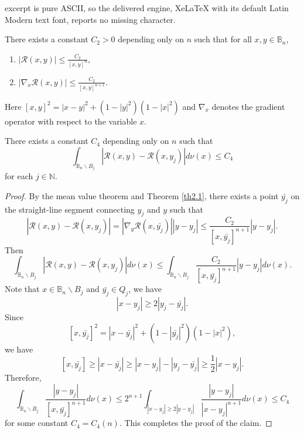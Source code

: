 \documentclass[10pt,a4paper]{amsart}
\newcommand{\B}{\mathbb{B}}
\newcommand{\N}{\mathbb{N}}
\begin{document}
excerpt is pure ASCII, so the delivered engine, XeLaTeX with its default Latin Modern text font, reports no missing character.
\begin{theorem}\label{th2.1}
	There exists a constant $C_2>0$ depending only on $n$ such that for all $x,y\in\B_n$,
	\begin{enumerate}[{(i)}]
		\item $|\mathcal{R} (x,y)|\leqslant\frac{C_2}{[x,y]^{n}},$
		\item $|\nabla_x\mathcal{R} (x,y)|\leqslant\frac{C_2}{[x,y]^{n+1}}.$
	\end{enumerate}
	Here $[x,y]^2=|x-y|^2+(1-|y|^2)(1-|x|^2)$ and $\nabla_x$ denotes the gradient operator with respect to the variable $x$.
\end{theorem}

\begin{claim}\label{claim2.1}
	There exists a constant $C_4$ depending only on $n$ such that
	\[\int_{\B_n\backslash B_j}|\mathcal{R} (x,y)-\mathcal{R} (x,y_j)|d\nu (x)\leqslant C_4\]
	for each $j\in\N$.
\end{claim}

\begin{proof}
By the mean value theorem and Theorem \ref{th2.1}, there exists a point $\bar{y_j}$ on the straight-line segment connecting $y_j$ and $y$ such that
\[|\mathcal{R} (x,y)-\mathcal{R} (x,y_j)|=|\nabla_y\mathcal{R} (x,\bar{y_j})| |y-y_j|\leqslant\frac{C_2}{[x,\bar{y_j}]^{n+1}}|y-y_j|.\]
Then 
\[
	\int_{\B_n\backslash B_j}|\mathcal{R} (x,y)-\mathcal{R} (x,y_j)|d\nu (x)\leqslant\int_{\B_n\backslash B_j}\frac{C_2}{[x,\bar{y_j}]^{n+1}}|y-y_j|d\nu(x).
\]
Note that $x\in\B_n\backslash B_j$ and $\bar{y_j}\in Q_j$, we have
\[|x-y_j|\geqslant 2|y_j-\bar{y_j}|.\]
Since 
\[
	[x,\bar{y_j}]^2=|x-\bar{y_j}|^2+(1-|\bar{y_j}|^2)(1-|x|^2),
\]
we have 
\[[x,\bar{y_j}]\geqslant |x-\bar{y_j}|\geqslant|x-y_j|-|y_j-\bar{y_j}|\geqslant\frac{1}{2}|x-y_j|.\]
Therefore, 
\[\int_{\B_n\backslash B_j}\frac{|y-y_j|}{[x,\bar{y_j}]^{n+1}}d\nu(x)\leqslant 2^{n+1}\int_{|x-y_j|\geqslant 2|y-y_j|}\frac{|y-y_j|}{|x-y_j|^{n+1}}d\nu(x)\leqslant C_4\]
for some constant $C_4=C_4(n)$.
This completes the proof of the claim.
\end{proof}
\end{document}
